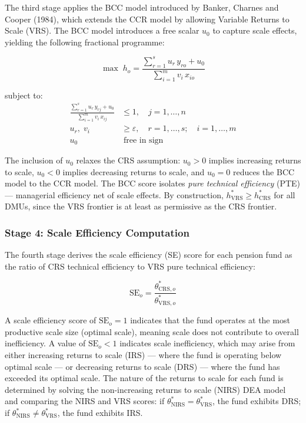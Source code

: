 \documentclass[12pt,a4paper]{article}
\begin{document}
The third stage applies the BCC model introduced by Banker, Charnes and Cooper (1984), which extends the CCR model by allowing Variable Returns to Scale (VRS). The BCC model introduces a free scalar $u_0$ to capture scale effects, yielding the following fractional programme:

\begin{equation}
\max \; h_o = \frac{\displaystyle\sum_{r=1}^{s} u_r \, y_{ro} + u_0}{\displaystyle\sum_{i=1}^{m} v_i \, x_{io}}
\end{equation}

subject to:
\begin{align}
\frac{\displaystyle\sum_{r=1}^{s} u_r \, y_{rj} + u_0}{\displaystyle\sum_{i=1}^{m} v_i \, x_{ij}} &\leq 1, \quad j = 1, \ldots, n \\[6pt]
u_r,\; v_i &\geq \varepsilon, \quad r = 1, \ldots, s; \quad i = 1, \ldots, m \\[6pt]
u_0 &\;\text{free in sign}
\end{align}

The inclusion of $u_0$ relaxes the CRS assumption: $u_0 > 0$ implies increasing returns to scale, $u_0 < 0$ implies decreasing returns to scale, and $u_0 = 0$ reduces the BCC model to the CCR model. The BCC score isolates \textit{pure technical efficiency} (PTE) --- managerial efficiency net of scale effects. By construction, $h^*_{\text{VRS}} \geq h^*_{\text{CRS}}$ for all DMUs, since the VRS frontier is at least as permissive as the CRS frontier.

\subsubsection{Stage 4: Scale Efficiency Computation}

The fourth stage derives the scale efficiency (SE) score for each pension fund as the ratio of CRS technical efficiency to VRS pure technical efficiency:

\begin{equation}
\text{SE}_o = \frac{\theta^*_{\text{CRS},o}}{\theta^*_{\text{VRS},o}}
\end{equation}

A scale efficiency score of $\text{SE}_o = 1$ indicates that the fund operates at the most productive scale size (optimal scale), meaning scale does not contribute to overall inefficiency. A value of $\text{SE}_o < 1$ indicates scale inefficiency, which may arise from either increasing returns to scale (IRS) --- where the fund is operating below optimal scale --- or decreasing returns to scale (DRS) --- where the fund has exceeded its optimal scale. The nature of the returns to scale for each fund is determined by solving the non-increasing returns to scale (NIRS) DEA model and comparing the NIRS and VRS scores: if $\theta^*_{\text{NIRS}} = \theta^*_{\text{VRS}}$, the fund exhibits DRS; if $\theta^*_{\text{NIRS}} \neq \theta^*_{\text{VRS}}$, the fund exhibits IRS.
\end{document}
